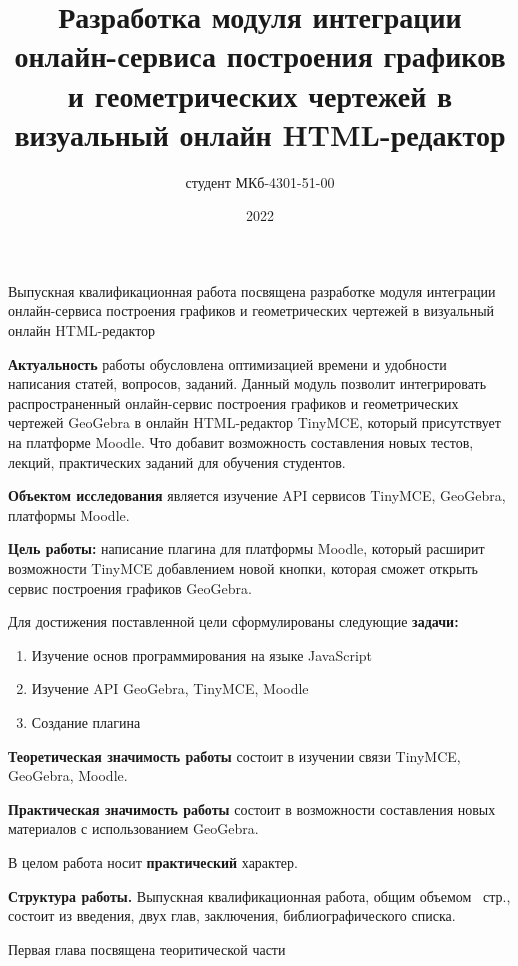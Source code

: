 \documentclass[14pt,Diplom]{diplomwork}
\date{2022}
\author{студент МКб-4301-51-00}{Мельков Алексей Константинович}
\title{Разработка модуля интеграции онлайн-сервиса построения графиков и геометрических чертежей в визуальный онлайн HTML-редактор}
\institute{математики и информационных систем}
\begin{document}
	
\maketitle
\makereferat		%
\newpage

\tableofcontents


Выпускная квалификационная работа посвящена разработке модуля интеграции онлайн-сервиса построения графиков и геометрических чертежей в визуальный онлайн HTML-редактор


\textbf{Актуальность} работы обусловлена оптимизацией времени и удобности написания статей, вопросов, заданий. Данный модуль позволит интегрировать распространенный онлайн-сервис построения графиков и геометрических чертежей GeoGebra в онлайн HTML-редактор TinyMCE, который присутствует на платформе Moodle. Что добавит возможность составления новых тестов, лекций, практических заданий для обучения студентов.

\textbf{Объектом исследования} является изучение API сервисов TinyMCE, GeoGebra, платформы Moodle.

\textbf{Цель работы:} написание плагина для платформы Moodle, который расширит возможности TinyMCE добавлением новой кнопки, которая сможет открыть сервис построения графиков GeoGebra.

Для достижения поставленной цели сформулированы следующие \mbox{\textbf{задачи:}}

\begin{enumerate}
	\item Изучение основ программирования на языке JavaScript
	\item Изучение API GeoGebra, TinyMCE, Moodle
	\item Создание плагина
\end{enumerate}



\textbf{Теоретическая значимость работы} состоит в изучении связи TinyMCE, GeoGebra, Moodle.

\textbf{Практическая значимость работы} состоит в возможности составления новых материалов с использованием GeoGebra.

В целом работа носит \textbf{практический} характер.



\textbf{Структура работы.} Выпускная квалификационная работа, общим объемом \pageref{LastPage}~стр., состоит из введения, двух глав, заключения, библиографического списка.

Первая глава посвящена теоритической части
\end{document}

